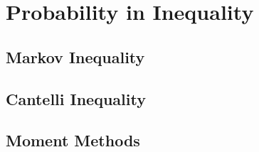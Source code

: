 \documentclass[inequalities.tex]{subfile}
\begin{document}
	\chapter{Probability in Inequality}\label{ch:prob}
	
	\section{Markov Inequality}
	
	\section{Cantelli Inequality}
	
	\section{Moment Methods}
\end{document}
